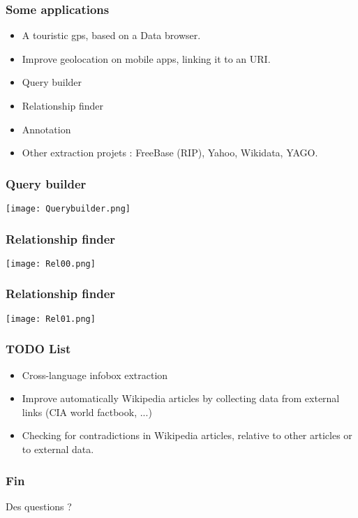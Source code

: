 \documentclass{beamer}
\begin{document}
\begin{frame}[fragile]
	\frametitle{Some applications}

	\begin{itemize}
	\item A touristic gps, based on a Data browser.
	\item Improve geolocation on mobile apps, linking it to an URI.
	\item Query builder
	\item Relationship finder
	\item Annotation
	\item Other extraction projets : FreeBase (RIP), Yahoo, Wikidata, YAGO.
	\end{itemize}
	
\end{frame}

\begin{frame}[fragile]
	\frametitle{Query builder}
	\texttt{[image: Querybuilder.png]}
\end{frame}

\begin{frame}[fragile]
	\frametitle{Relationship finder}
	\texttt{[image: Rel00.png]}
\end{frame}

\begin{frame}[fragile]
	\frametitle{Relationship finder}
	\texttt{[image: Rel01.png]}
\end{frame}


\begin{frame}[fragile]
	\frametitle{TODO List}

	\begin{itemize}
	\item Cross-language infobox extraction
	\item Improve automatically Wikipedia articles by collecting data from external links (CIA world factbook, ...)
	\item Checking for contradictions in Wikipedia articles, relative to other articles or to external data.
	\end{itemize}
	
\end{frame}

\begin{frame}
  \frametitle{Fin}
  Des questions ?
\end{frame}
\end{document}
